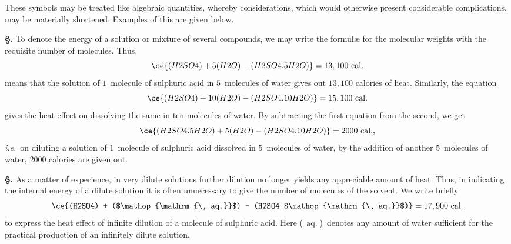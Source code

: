 \documentclass[12pt]{book}[2005/09/16]
\newcommand{\Section}[1]{
  \medskip\par\textbf{§\;#1}
  \label{section:#1}
}
\newcommand{\PageSep}[1]{\ignorespaces}
\newcommand{\ie}{\emph{i.e.}}
\DeclareMathOperator{\aq}{\, aq.}
\newcommand{\Unit}[1]{\text{\upshape #1}}
\begin{document}
These symbols may be treated like algebraic quantities,
whereby considerations, which would otherwise present
\PageSep{70}
considerable complications, may be materially shortened.
Examples of this are given below.

\Section{96.} To denote the energy of a solution or mixture of
%
several compounds, we may write the formulæ for the molecular
weights with the requisite number of molecules.
Thus,
\[
\ce{(H2SO4) + 5(H2O) - (H2SO4 . 5H2O)} = 13,100~\Unit{cal.}
\]
means that the solution of $1$~molecule of sulphuric acid in
$5$~molecules of water gives out $13,100$ calories of heat.
Similarly, the equation
\[
\ce{(H2SO4) + 10(H2O) - (H2SO4 . 10H2O)} = 15,100~\Unit{cal.}
\]
gives the heat effect on dissolving the same in ten molecules
%
of water. By subtracting the first equation from the second,
we get
\[
\ce{(H2SO4 . 5H2O) + 5(H2O) - (H2SO4 . 10H2O)} = 2000~\Unit{cal.},
\]
\ie\ on diluting a solution of $1$~molecule of sulphuric acid
dissolved in $5$~molecules of water, by the addition of another
$5$~molecules of water, $2000$ calories are given out.

\Section{97.} As a matter of experience, in very dilute solutions
further dilution no longer yields any appreciable amount of
%
heat. Thus, in indicating the internal energy of a dilute
solution it is often unnecessary to give the number of molecules
of the solvent. We write briefly
\[
\ce{(H2SO4) + ($\aq$) - (H2SO4 $\aq$)} = 17,900~\Unit{cal.}
\]
to express the heat effect of infinite dilution of a molecule
%
of sulphuric acid. Here ($\aq$)\ denotes any amount of water
sufficient for the practical production of an infinitely dilute
solution.
\end{document}
